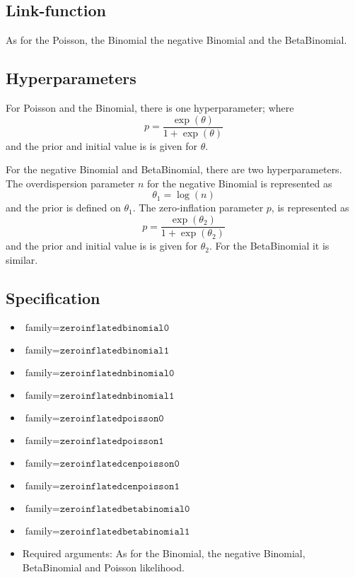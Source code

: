 \documentclass[a4paper,11pt]{article}
\begin{document}
\subsection*{Link-function}

As for the Poisson, the Binomial the negative Binomial and the BetaBinomial.

\subsection*{Hyperparameters}

For Poisson and the Binomial, there is one hyperparameter; where
\begin{displaymath}
    p = \frac{\exp(\theta)}{1+\exp(\theta)}
\end{displaymath}
and the prior and initial value is is given for $\theta$.

For the negative Binomial and BetaBinomial, there are two
hyperparameters.  The overdispersion parameter $n$ for the negative
Binomial is represented as
\begin{displaymath}
    \theta_{1} = \log(n)
\end{displaymath}
and the prior is defined on $\theta_{1}$. The zero-inflation parameter
$p$, is represented as
\begin{displaymath}
    p = \frac{\exp(\theta_{2})}{1+\exp(\theta_{2})}
\end{displaymath}
and the prior and initial value is is given for $\theta_{2}$. For the
BetaBinomial it is similar.

\subsection*{Specification}

\begin{itemize}
\item $\text{family}=\texttt{zeroinflatedbinomial0}$
\item $\text{family}=\texttt{zeroinflatedbinomial1}$
\item $\text{family}=\texttt{zeroinflatednbinomial0}$
\item $\text{family}=\texttt{zeroinflatednbinomial1}$
\item $\text{family}=\texttt{zeroinflatedpoisson0}$
\item $\text{family}=\texttt{zeroinflatedpoisson1}$
\item $\text{family}=\texttt{zeroinflatedcenpoisson0}$
\item $\text{family}=\texttt{zeroinflatedcenpoisson1}$
\item $\text{family}=\texttt{zeroinflatedbetabinomial0}$
\item $\text{family}=\texttt{zeroinflatedbetabinomial1}$
\item Required arguments: As for the Binomial, the negative Binomial,
    BetaBinomial and Poisson likelihood.
\end{itemize}
\end{document}
